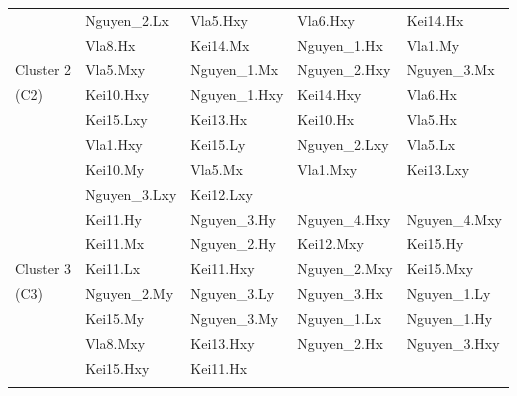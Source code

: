 \begin{table}
\begin{tabular}{lllll}
& Nguyen\_2.Lx & Vla5.Hxy & Vla6.Hxy & Kei14.Hx \\
& Vla8.Hx & Kei14.Mx & Nguyen\_1.Hx & Vla1.My \\
Cluster 2 & Vla5.Mxy & Nguyen\_1.Mx & Nguyen\_2.Hxy & Nguyen\_3.Mx\\
(C2) & Kei10.Hxy & Nguyen\_1.Hxy & Kei14.Hxy & Vla6.Hx \\
& Kei15.Lxy & Kei13.Hx & Kei10.Hx & Vla5.Hx \\
& Vla1.Hxy & Kei15.Ly  & Nguyen\_2.Lxy & Vla5.Lx \\
& Kei10.My & Vla5.Mx & Vla1.Mxy & Kei13.Lxy \\
& Nguyen\_3.Lxy & Kei12.Lxy & & \\
\hline
& Kei11.Hy & Nguyen\_3.Hy & Nguyen\_4.Hxy & Nguyen\_4.Mxy \\
& Kei11.Mx & Nguyen\_2.Hy & Kei12.Mxy & Kei15.Hy \\
Cluster 3 & Kei11.Lx & Kei11.Hxy & Nguyen\_2.Mxy & Kei15.Mxy \\
(C3) & Nguyen\_2.My & Nguyen\_3.Ly & Nguyen\_3.Hx & Nguyen\_1.Ly \\
& Kei15.My & Nguyen\_3.My & Nguyen\_1.Lx & Nguyen\_1.Hy \\
& Vla8.Mxy & Kei13.Hxy & Nguyen\_2.Hx & Nguyen\_3.Hxy \\
& Kei15.Hxy & Kei11.Hx & & \\

\noalign{\smallskip}\hline
\end{tabular}
\end{table}
